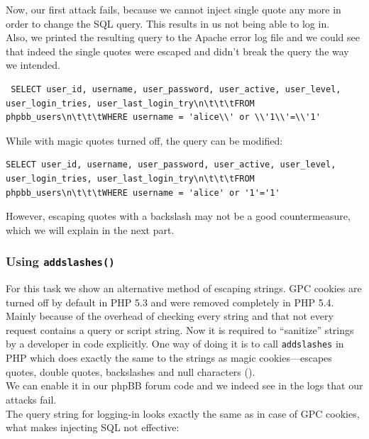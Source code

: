 \documentclass[12pt, a4paper]{article}
\begin{document}
Now, our first attack fails, because we cannot inject single quote any more in order to change the SQL query. This results in us not being able to log in.\\
Also, we printed the resulting query to the Apache error log file and we could see that indeed the single quotes were escaped and didn't break the query the way we intended.\\
\lstset{
	captionpos=b,
	frame=single,
	language=SQL,
	breaklines=true,
	label=sql13
}
\begin{lstlisting}
 SELECT user_id, username, user_password, user_active, user_level, user_login_tries, user_last_login_try\n\t\t\tFROM phpbb_users\n\t\t\tWHERE username = 'alice\\' or \\'1\\'=\\'1'
\end{lstlisting}
While with magic quotes turned off, the query can be modified:
\lstset{
	captionpos=b,
	frame=single,
	language=SQL,
	breaklines=true,
	label=sql2
}
\begin{lstlisting}
SELECT user_id, username, user_password, user_active, user_level, user_login_tries, user_last_login_try\n\t\t\tFROM phpbb_users\n\t\t\tWHERE username = 'alice' or '1'='1'
\end{lstlisting}
However, escaping quotes with a backslash may not be a good countermeasure, which we will explain in the next part.

\subsubsection{Using \texttt{addslashes()}}

For this task we show an alternative method of escaping strings. GPC cookies are turned off by default in PHP 5.3 and were removed completely in PHP 5.4. Mainly because of the overhead of checking every string and that not every request contains a query or script string. Now it is required to ``sanitize'' strings by a developer in code explicitly. One way of doing it is to call \texttt{addslashes} in PHP which does exactly the same to the strings as magic cookies---escapes quotes, double quotes, backslashes and null characters (\cite{php:sql}).\\

We can enable it in our phpBB forum code and we indeed see in the logs that our attacks fail.\\
The query string for logging-in looks exactly the same as in case of GPC cookies, what makes injecting SQL not effective:
\end{document}
